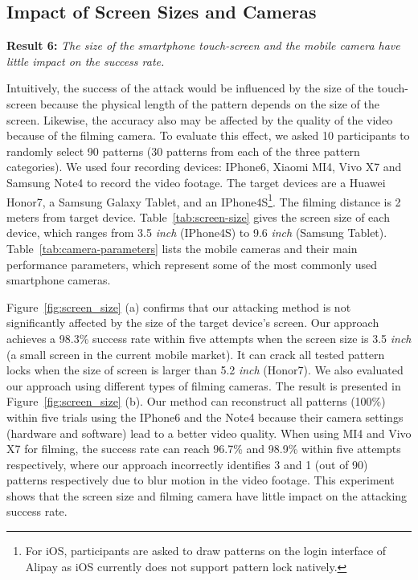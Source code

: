     \vspace{-3mm}
    \subsection{Impact of Screen Sizes and Cameras}
    \label{section: screen-size and cameras}
    \noindent \textbf{Result 6:} \emph{The size of the smartphone touch-screen and the mobile camera have little impact on the success rate.}

    Intuitively, the success of the attack would be influenced by the size of
    the touch-screen because the physical length of the pattern depends on
    the size of the screen. Likewise, the accuracy also may be affected by
    the quality of the video because of the filming camera. To evaluate this
    effect, we asked 10 participants to randomly select 90 patterns (30
    patterns from each of the three pattern categories). We used four
    recording devices: IPhone6, Xiaomi MI4, Vivo X7 and Samsung Note4 to
    record the video footage. The target devices are a Huawei Honor7, a
    Samsung Galaxy Tablet, and an IPhone4S\footnote{For iOS, participants are asked
    to draw  patterns on the login interface of Alipay as iOS
    currently does not support pattern lock natively.}. The filming distance is 2
    meters from target device. Table~\ref{tab:screen-size} gives the screen
    size of each device, which ranges from 3.5 \emph{inch} (IPhone4S) to
    9.6 \emph{inch} (Samsung Tablet). Table~\ref{tab:camera-parameters} lists
    the mobile cameras and their main performance parameters, which
    represent some of the most commonly used smartphone cameras.

    Figure~\ref{fig:screen_size} (a) confirms that our attacking method
    is not significantly affected by the size of the
     target device's screen. Our approach achieves a 98.3\%  success rate within five
    attempts when the screen size is 3.5 \emph{inch} (a small screen in the current
     mobile market). It can crack all tested pattern locks when
    the size of screen is larger than 5.2 \emph{inch} (Honor7). We also
    evaluated  our approach using different types of filming cameras.
    The result is presented in Figure~\ref{fig:screen_size}
    (b). Our method can reconstruct all patterns (100\%) within five trials using
    the IPhone6 and the Note4 because their camera settings (hardware and software) lead to a better video
    quality.   When using MI4 and Vivo X7 for filming,
     the success rate can reach 96.7\% and 98.9\% within five
    attempts respectively, where our approach incorrectly identifies 3 and 1 (out of
    90) patterns respectively due to blur motion in the video footage.
    This experiment shows that the screen size and filming camera
    have little impact on the attacking success rate.

